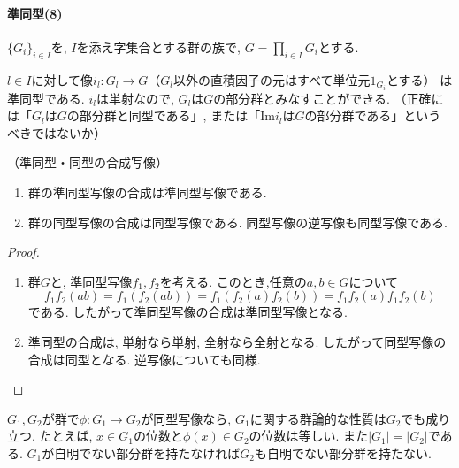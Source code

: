 \paragraph*{準同型(8)}
$\{ G_i \}_{i \in I}$を, $I$を添え字集合とする群の族で,
$ G=\prod_{i \in I}G_i$とする. 

$l \in I$に対して像$i_l: G_l \to G $（$G_l$以外の直積因子の元はすべて単位元$1_{G_i}$とする）
は準同型である.
$i_l$は単射なので, $G_l$は$G$の部分群とみなすことができる.
（正確には「$G_l$は$G$の部分群と同型である」, 
または「$\mathrm{Im}i_l$は$G$の部分群である」というべきではないか）\newline

\begin{tcolorbox}
	\begin{prp*}
		（準同型・同型の合成写像）     
		\begin{enumerate}
			\item 群の準同型写像の合成は準同型写像である.
			\item 群の同型写像の合成は同型写像である. 同型写像の逆写像も同型写像である.
		\end{enumerate}
	\end{prp*}
\end{tcolorbox}
\begin{proof}
	\begin{enumerate}
		\item 群$G$と, 準同型写像$f_1, f_2$を考える.
		このとき,任意の$a,b \in G$について
        \[f_1 f_2(ab) = f_1(f_2(ab)) = f_1(f_2(a) f_2(b))
		= f_1 f_2(a) f_1 f_2(b)\]
		である.	したがって準同型写像の合成は準同型写像となる.
		\item 準同型の合成は, 単射なら単射, 全射なら全射となる.
		したがって同型写像の合成は同型となる. 逆写像についても同様.
	\end{enumerate}
\end{proof}\leavevmode

$G_1, G_2$が群で$ \phi: G_1 \to G_2 $が同型写像なら,
$G_1$に関する群論的な性質は$G_2$でも成り立つ.
たとえば, $ x \in G_1$の位数と$\phi(x) \in G_2$の位数は等しい.
また$|G_1| = |G_2|$である.
$G_1$が自明でない部分群を持たなければ$G_2$も自明でない部分群を持たない.\newline


